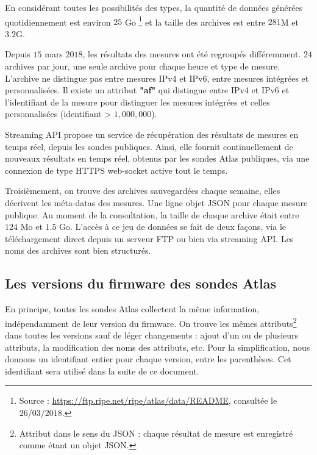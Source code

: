 En considérant toutes les possibilités des types, la quantité de données générées quotidiennement est environ $25$ Go \footnote{Source :  \url{https://ftp.ripe.net/ripe/atlas/data/README}, consultée le $26/03/2018$.}    et la taille des  archives est entre $281$M et $3.2$G.

Depuis $15$ mars $2018$, les résultats des mesures ont été regroupés différemment. $24$ archives par jour,  une seule archive pour chaque heure et  type de mesure. L'archive ne distingue pas entre mesures IPv4 et IPv6,  entre mesures intégrées et  personnalisées. Il existe un attribut \textbf{"af"} qui distingue entre IPv4 et IPv6 et l'identifiant de la mesure pour distinguer les  mesures intégrées et celles personnalisées (identifiant > $1,000,000$). 

Streaming API propose un service de récupération des résultats de mesures en temps réel, depuis les sondes publiques. Ainsi, elle  fournit continuellement de nouveaux résultats en temps réel, obtenus par les sondes  Atlas publiques,  via une connexion de type HTTPS web-socket active tout le temps.

Troisièmement, on trouve des archives sauvegardées chaque semaine, elles décrivent les  méta-datas des mesures. Une ligne objet JSON pour chaque mesure publique. Au moment de la consultation, la taille de chaque archive était entre $124$ Mo et $1.5$ Go. L'accès à ce jeu de données se fait de deux façons, via le téléchargement direct depuis un serveur  FTP ou bien via streaming API. Les noms des archives sont bien structurés.

\subsection{Les versions du firmware des sondes Atlas} \label{subsec:firmwareversion}
En principe, toutes les sondes Atlas collectent la même information, indépendamment de leur version du firmware. On trouve les mêmes attributs\footnote{Attribut dans le sens du JSON : chaque résultat de mesure est enregistré comme étant un objet JSON.}  dans toutes les versions sauf de léger changements : ajout d'un ou de plusieurs attributs, la modification des noms des attributs, etc. Pour la simplification, nous donnons un identifiant entier pour chaque version, entre les parenthèses. Cet identifiant sera utilisé dans la suite de ce document. 



